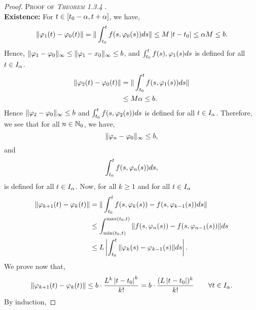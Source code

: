 \begin{proof}
  \textsc{
 Proof of \it Theorem 1.3.4 \normalfont
  }. \\
   \textbf{Existence:} For $t \in  \left[ t_0-\alpha, t+\alpha \right]$, we have,
  \[
  \| \varphi _{1}(t)  - \varphi _{0}(t)  \|  = 
  \| \int_{t_0}^{t} f(s, \varphi _{0}(s) ) ds \|  \leq 
  M \left| t-t_0 \right|  \leq  \alpha M \leq b.
  \]
  Hence,  $\| \varphi _{1} - \varphi _{0} \| _{\infty } \leq  \| \varphi _{1} - x_0 \| _{\infty } \leq  b $, and 
  $
  \int_{t_0}^{t} f(s) , \varphi _{1}(s) ds 
  $ is defined for all $t \in   I_{\alpha} $.
  \begin{align*}
  \| \varphi _{2}(t)  - \varphi _{0}(t)  \|  
  &= 
  \| \int_{t_0}^{t} f(s, \varphi _{1}(s) ) ds \|  \\
  & \leq M \alpha \leq  b.
  \end{align*}
  Hence $ \| \varphi _{2} - \varphi _{0} \|_{\infty } \leq b$ and 
  $\int_{t_0}^{t} f(s, \varphi _{2}(s) ) ds $ is defined for all $t \in   I_{\alpha} $. Therefore, we 
  see that for all $n \in  \mathbb{N}_{0}$, we have, 
  \[
    \| \varphi _{n} - \varphi _{0} \|  _{\infty }\leq b,
  \]
  and 
  \[
  \int_{t_0}^{t} f(s, \varphi _{n}(s) ) ds,
  \]
  is defined for all $t \in   I_{\alpha} $. Now, for all $k \geq 1 $ and for all $t \in  I_{\alpha}$ 
  \begin{align*}
    \| \varphi _{k+1}(t)  - \varphi _{k}(t)  \|  &=
    \| \int_{t_0}^{t} 
    f(s, \varphi _{k}(s) )  - f(s, \varphi _{k-1}(s) ) ds\|  \\
                                         & \leq  
                                         \int_{ \min (t_0, t) }^{\max (t_0, t) } \| f(s, \varphi _{n}(s) ) 
                                         - f(s, \varphi _{n-1}(s) ) \| ds
                                         \\
                                         & \leq 
                                         L \left| \int_{t_0}^{t} \| \varphi _{k}(s)  - \varphi _{k-1}(s)  \| ds  \right|.
  \end{align*}
  We prove now that,
  \[
  \| \varphi _{k+1}(t)  - \varphi _{k}(t)  \|  \leq  b \cdot 
  \frac{L^{k}\left| t-t_0 \right|  ^{k}}{k !} = 
  b \cdot \frac{(L \left| t-t_0 \right|  ) ^{k}}{k!}
  \quad \quad \forall  t \in   I_{\alpha}.
  \]
  By induction, 
\end{proof}
